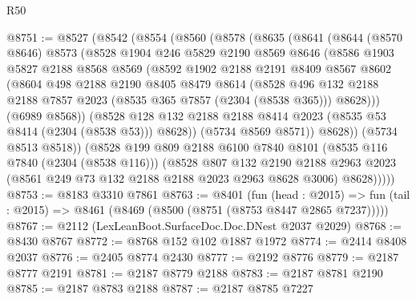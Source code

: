\begin{lexlean}{R50}
\begin{coremodule}
@8751 := @8527
    (@8542
      (@8554
        (@8560
          (@8578
            (@8635
              (@8641
                (@8644
                  (@8570 @8646)
                  @8573
                  (@8528
                    @1904
                    @246
                    @5829
                    @2190
                    @8569
                    @8646
                    (@8586
                      @1903
                      @5827
                      @2188
                      @8568
                      @8569
                      (@8592
                        @1902
                        @2188
                        @2191
                        @8409
                        @8567
                        @8602
                        (@8604
                          @498
                          @2188
                          @2190
                          @8405
                          @8479
                          @8614
                          (@8528
                            @496
                            @132
                            @2188
                            @2188
                            @7857
                            @2023
                            (@8535 @365 @7857 (@2304 (@8538 @365)))
                            @8628)))
                      (@6989 @8568))
                    (@8528
                      @128
                      @132
                      @2188
                      @2188
                      @8414
                      @2023
                      (@8535 @53 @8414 (@2304 (@8538 @53)))
                      @8628))
                  (@5734 @8569 @8571))
                @8628))
            (@5734 @8513 @8518))
          (@8528
            @199
            @809
            @2188
            @6100
            @7840
            @8101
            (@8535 @116 @7840 (@2304 (@8538 @116)))
            (@8528
              @807
              @132
              @2190
              @2188
              @2963
              @2023
              (@8561 @249 @73 @132 @2188 @2188 @2023 @2963 @8628 @3006)
              @8628)))))
@8753 := @8183 @3310 @7861
@8763 := @8401
    (fun (head : @2015) =>
    fun (tail : @2015) => @8461 (@8469 (@8500 (@8751 (@8753 @8447 @2865 @7237)))))
@8767 := @2112 (LexLeanBoot.SurfaceDoc.Doc.DNest @2037 @2029)
@8768 := @8430 @8767
@8772 := @8768 @152 @102 @1887 @1972
@8774 := @2414 @8408 @2037
@8776 := @2405 @8774 @2430
@8777 := @2192 @8776
@8779 := @2187 @8777 @2191
@8781 := @2187 @8779 @2188
@8783 := @2187 @8781 @2190
@8785 := @2187 @8783 @2188
@8787 := @2187 @8785 @7227

\end{coremodule}
\end{lexlean}
